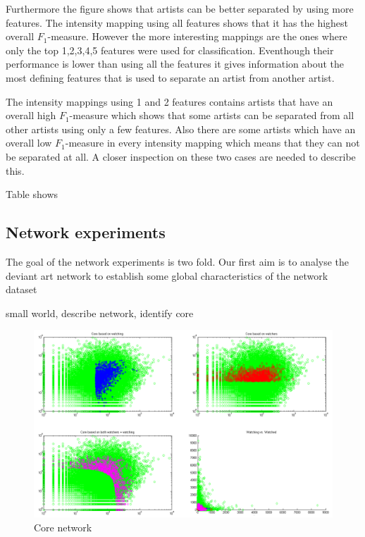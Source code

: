 Furthermore the figure shows that artists can be better separated by using more features.
The intensity mapping using all features shows that it has the highest overall $F_1$-measure.
However the more interesting mappings are the ones where only the top 1,2,3,4,5 features were used for classification.
Eventhough their performance is lower than using all the features it gives information about the most defining features that is used to separate an artist from another artist.

The intensity mappings using 1 and 2 features contains artists that have an overall high $F_1$-measure which shows that some artists can be separated from all other artists using only a few features.
Also there are some artists which have an overall low $F_1$-measure in every intensity mapping which means that they can not be separated at all.
A closer inspection on these two cases are needed to describe this.

Table shows 

\subsection{Network experiments}
The goal of the network experiments is two fold. Our first aim is to analyse the deviant art network to establish some global characteristics of the network
dataset

small world, describe network, identify core

\begin{algoritm}
\end{algoritm}

\begin{figure}[htb]
  \centering
  \includegraphics[width=1\linewidth]{img/core.png}
  \caption{Core network}
  \label{fig:results_core}
\end{figure}